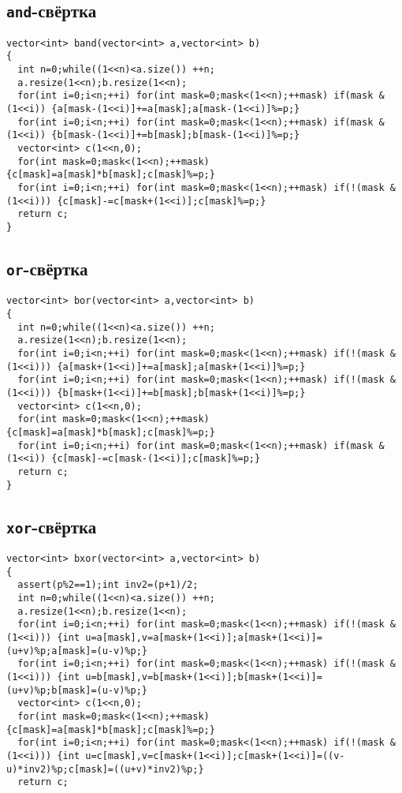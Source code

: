 \subsection{\texttt{and}-свёртка}
\begin{lstlisting}
vector<int> band(vector<int> a,vector<int> b)
{
  int n=0;while((1<<n)<a.size()) ++n;
  a.resize(1<<n);b.resize(1<<n);
  for(int i=0;i<n;++i) for(int mask=0;mask<(1<<n);++mask) if(mask & (1<<i)) {a[mask-(1<<i)]+=a[mask];a[mask-(1<<i)]%=p;}
  for(int i=0;i<n;++i) for(int mask=0;mask<(1<<n);++mask) if(mask & (1<<i)) {b[mask-(1<<i)]+=b[mask];b[mask-(1<<i)]%=p;}
  vector<int> c(1<<n,0);
  for(int mask=0;mask<(1<<n);++mask) {c[mask]=a[mask]*b[mask];c[mask]%=p;}
  for(int i=0;i<n;++i) for(int mask=0;mask<(1<<n);++mask) if(!(mask & (1<<i))) {c[mask]-=c[mask+(1<<i)];c[mask]%=p;}
  return c;
}
\end{lstlisting}
\subsection{\texttt{or}-свёртка}
\begin{lstlisting}
vector<int> bor(vector<int> a,vector<int> b)
{
  int n=0;while((1<<n)<a.size()) ++n;
  a.resize(1<<n);b.resize(1<<n);
  for(int i=0;i<n;++i) for(int mask=0;mask<(1<<n);++mask) if(!(mask & (1<<i))) {a[mask+(1<<i)]+=a[mask];a[mask+(1<<i)]%=p;}
  for(int i=0;i<n;++i) for(int mask=0;mask<(1<<n);++mask) if(!(mask & (1<<i))) {b[mask+(1<<i)]+=b[mask];b[mask+(1<<i)]%=p;}
  vector<int> c(1<<n,0);
  for(int mask=0;mask<(1<<n);++mask) {c[mask]=a[mask]*b[mask];c[mask]%=p;}
  for(int i=0;i<n;++i) for(int mask=0;mask<(1<<n);++mask) if(mask & (1<<i)) {c[mask]-=c[mask-(1<<i)];c[mask]%=p;}
  return c;
}
\end{lstlisting}
\subsection{\texttt{xor}-свёртка}
\begin{lstlisting}
vector<int> bxor(vector<int> a,vector<int> b)
{
  assert(p%2==1);int inv2=(p+1)/2;
  int n=0;while((1<<n)<a.size()) ++n;
  a.resize(1<<n);b.resize(1<<n);
  for(int i=0;i<n;++i) for(int mask=0;mask<(1<<n);++mask) if(!(mask & (1<<i))) {int u=a[mask],v=a[mask+(1<<i)];a[mask+(1<<i)]=(u+v)%p;a[mask]=(u-v)%p;}
  for(int i=0;i<n;++i) for(int mask=0;mask<(1<<n);++mask) if(!(mask & (1<<i))) {int u=b[mask],v=b[mask+(1<<i)];b[mask+(1<<i)]=(u+v)%p;b[mask]=(u-v)%p;}
  vector<int> c(1<<n,0);
  for(int mask=0;mask<(1<<n);++mask) {c[mask]=a[mask]*b[mask];c[mask]%=p;}
  for(int i=0;i<n;++i) for(int mask=0;mask<(1<<n);++mask) if(!(mask & (1<<i))) {int u=c[mask],v=c[mask+(1<<i)];c[mask+(1<<i)]=((v-u)*inv2)%p;c[mask]=((u+v)*inv2)%p;}
  return c;
\end{lstlisting}
